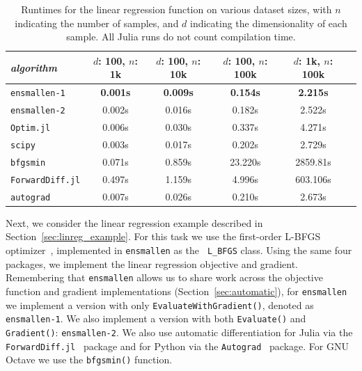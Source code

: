 \begin{table}[t!]
\centering
\begin{tabular}{lccccc}
\toprule
{\em algorithm} & $d$: 100, $n$: 1k & $d$: 100, $n$: 10k & $d$: 100, $n$:
100k & $d$: 1k, $n$: 100k \\
\midrule
\texttt{ensmallen-1} & {\bf 0.001s} & {\bf 0.009s} & {\bf 0.154s} & {\bf 2.215s} \\
\texttt{ensmallen-2} & 0.002s & 0.016s & 0.182s & 2.522s \\
\texttt{Optim.jl} & 0.006s & 0.030s & 0.337s & 4.271s \\
\texttt{scipy} & 0.003s & 0.017s & 0.202s & 2.729s \\
\texttt{bfgsmin} & 0.071s & 0.859s & 23.220s & 2859.81s\\
\texttt{ForwardDiff.jl} & 0.497s & 1.159s & 4.996s & 603.106s \\
\texttt{autograd} & 0.007s & 0.026s & 0.210s & 2.673s \\
\bottomrule
\end{tabular}
\vspace*{0.25ex}
\caption{
Runtimes for the linear regression function on various dataset sizes,
with $n$ indicating the number of samples,
and $d$ indicating the dimensionality of each sample.
All Julia runs do not count compilation time.}
\label{tab:lbfgs}
\end{table}

Next, we consider the linear regression example described in
Section~\ref{sec:linreg_example}.  For this task we use the first-order L-BFGS
optimizer~\cite{liu1989limited}, implemented in {\tt ensmallen} as the {\tt
L\_BFGS} class.  Using the same four packages, we implement
the linear regression objective and gradient.  Remembering that {\tt ensmallen}
allows us to share work across the objective function and gradient
implementations (Section~\ref{sec:automatic}), for {\tt ensmallen} we implement
a version with only {\tt EvaluateWithGradient()}, denoted as {\tt ensmallen-1}.
We also implement a version with both \texttt{Evaluate()} and
\texttt{Gradient()}: \texttt{ensmallen-2}.  We also use automatic
differentiation for Julia via the 
\texttt{ForwardDiff.jl}~\cite{RevelsLubinPapamarkou2016} package
and for Python via the \texttt{Autograd}~\cite{maclaurin2015autograd} package.  
For GNU Octave we use the \texttt{bfgsmin()} function.


